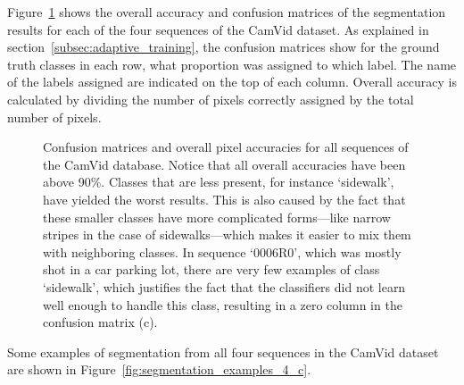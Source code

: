 Figure~\ref{fig:conf_matrix_4_c} shows the overall accuracy and confusion matrices of the segmentation results for each of the four sequences of the CamVid dataset. As explained in section~\ref{subsec:adaptive_training}, the confusion matrices show for the ground truth classes in each row, what proportion was assigned to which label. The name of the labels assigned are indicated on the top of each column. Overall accuracy is calculated by dividing the number of pixels correctly assigned by the total number of pixels.

\begin{figure}[htb]
\caption[Confusion matrices for 4-class set segmentation]{Confusion matrices and overall pixel accuracies for all sequences of the CamVid database. Notice that all overall accuracies have been above 90\%. Classes that are less present, for instance `sidewalk', have yielded the worst results. This is also caused by the fact that these smaller classes have more complicated forms---like narrow stripes in the case of sidewalks---which makes it easier to mix them with neighboring classes. In sequence `0006R0', which was mostly shot in a car parking lot, there are very few examples of class `sidewalk', which justifies the fact that the classifiers did not learn well enough to handle this class, resulting in a zero column in the confusion matrix (c).}
\label{fig:conf_matrix_4_c}
\end{figure}

Some examples of segmentation from all four sequences in the CamVid dataset are shown in Figure~\ref{fig:segmentation_examples_4_c}.


